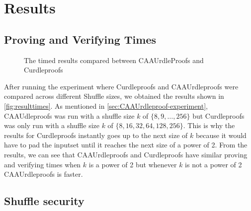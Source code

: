\section{Results}\label{sec:results}




\subsection{Proving and Verifying Times}\label{subsec:results:provingverifying}
\begin{figure}[!ht]
    \centering
    \qquad
    \caption{The timed results compared between CAAUrdleProofs and Curdleproofs}%
    \label{fig:resulttimes}%
\end{figure}
After running the experiment where Curdleproofs and CAAUrdleproofs were compared across different Shuffle sizes, we obtained the results shown in \autoref{fig:resulttimes}.
As mentioned in \autoref{sec:CAAUrdleproof-experiment}, CAAUdleproofs was run with a shuffle size $k$ of $\{8,9,\dots,256\}$ but Curdleproofs was only run with a shuffle size $k$ of $\{8,16,32,64,128,256\}$.
This is why the results for Curdleproofs instantly goes up to the next size of $k$ because it would have to pad the inputset until it reaches the next size of a power of 2.
From the results, we can see that CAAUrdleproofs and Curdleproofs have similar proving and verifying times when $k$ is a power of 2 but whenever $k$ is not a power of 2 CAAUrdleproofs is faster.


\subsection{Shuffle security}\label{subsec:Shuffle-security}

